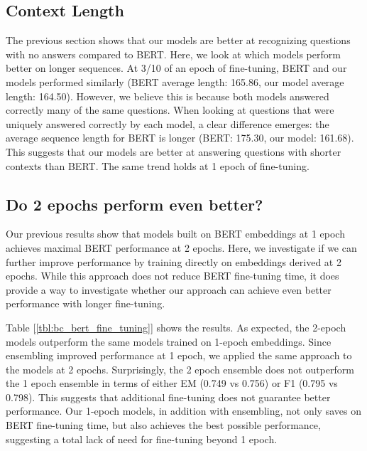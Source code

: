 \subsection{Context Length}

The previous section shows that our models are better at recognizing questions with no answers compared to BERT. Here, we look at which models perform better on longer sequences. At 3/10 of an epoch of fine-tuning, BERT and our models performed similarly (BERT average length: 165.86, our model average length: 164.50). However, we believe this is because both models answered correctly many of the same questions. When looking at questions that were uniquely answered correctly by each model, a clear difference emerges: the average sequence length for BERT is longer (BERT: 175.30, our model: 161.68). This suggests that our models are better at answering questions with shorter contexts than BERT. The same trend holds at 1 epoch of fine-tuning.

\subsection{Do 2 epochs perform even better?}
	
Our previous results show that models built on BERT embeddings at 1 epoch achieves maximal BERT performance at 2 epochs. Here, we investigate if we can further improve performance by training directly on embeddings derived at 2 epochs. While this approach does not reduce BERT fine-tuning time, it does provide a way to investigate whether our approach can achieve even better performance with longer fine-tuning. 
	
Table [\ref{tbl:bc_bert_fine_tuning}] shows the results. As expected, the 2-epoch models outperform the same models trained on 1-epoch embeddings. Since ensembling improved performance at 1 epoch, we applied the same approach to the models at 2 epochs. Surprisingly, the 2 epoch ensemble does not outperform the 1 epoch ensemble in terms of either EM (0.749 vs 0.756) or F1 (0.795 vs 0.798). This suggests that additional fine-tuning does not guarantee better performance. Our 1-epoch models, in addition with ensembling, not only saves on BERT fine-tuning time, but also achieves the best possible performance, suggesting a total lack of need for fine-tuning beyond 1 epoch.

